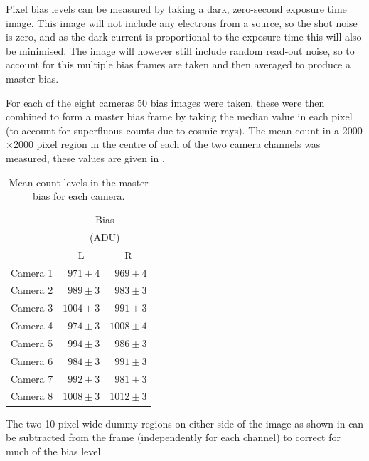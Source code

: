 \begin{colsection}
\begin{colsection}
Pixel bias levels can be measured by taking a dark, zero-second exposure time image. This image will not include any electrons from a source, so the shot noise is zero, and as the dark current is proportional to the exposure time this will also be minimised. The image will however still include random read-out noise, so to account for this multiple bias frames are taken and then averaged to produce a master bias.

For each of the eight cameras 50 bias images were taken, these were then combined to form a master bias frame by taking the median value in each pixel (to account for superfluous counts due to cosmic rays). The mean count in a 2000$\times$2000 pixel region in the centre of each of the two camera channels was measured, these values are given in .

\begin{table}[t]
    \begin{center}
        \begin{tabular}{c|rr} %
             & \multicolumn{2}{c}{Bias} \\
             & \multicolumn{2}{c}{(ADU)} \\
             & \multicolumn{1}{c}{L} & \multicolumn{1}{c}{R} \\
            \midrule
            Camera 1 & $971\pm4$ & $969\pm4$ \\
            Camera 2 & $989\pm3$ & $983\pm3$ \\
            Camera 3 & $1004\pm3$ & $991\pm3$ \\
            Camera 4 & $974\pm3$ & $1008\pm4$ \\
            Camera 5 & $994\pm3$ & $986\pm3$ \\
            Camera 6 & $984\pm3$ & $991\pm3$ \\
            Camera 7 & $992\pm3$ & $981\pm3$ \\
            Camera 8 & $1008\pm3$ & $1012\pm3$ \\
        \end{tabular}
    \end{center}
    \caption[TODO]{
        Mean count levels in the master bias for each camera.
        }\label{tab:bias}
\end{table}

The two 10-pixel wide dummy regions on either side of the image as shown in  can be subtracted from the frame (independently for each channel) to correct for much of the bias level.


\end{colsection}
\end{colsection}
